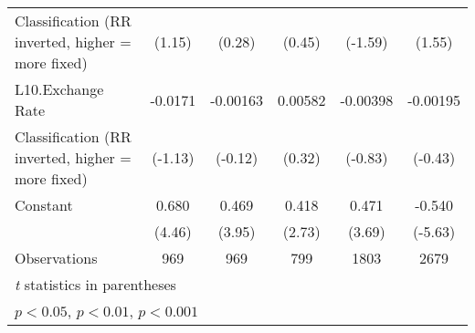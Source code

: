 {\begin{tabular}{l*{5}{c}}
Classification (RR inverted, higher = more fixed)&      (1.15)         &      (0.28)         &      (0.45)         &     (-1.59)         &      (1.55)         \\
[1em]
L10.Exchange Rate   &     -0.0171         &    -0.00163         &     0.00582         &    -0.00398         &    -0.00195         \\
Classification (RR inverted, higher = more fixed)&     (-1.13)         &     (-0.12)         &      (0.32)         &     (-0.83)         &     (-0.43)         \\
[1em]
Constant            &       0.680\sym{***}&       0.469\sym{***}&       0.418\sym{**} &       0.471\sym{***}&      -0.540\sym{***}\\
                    &      (4.46)         &      (3.95)         &      (2.73)         &      (3.69)         &     (-5.63)         \\
\hline
Observations        &         969         &         969         &         799         &        1803         &        2679         \\
\hline\hline
\multicolumn{6}{l}{\footnotesize \textit{t} statistics in parentheses}\\
\multicolumn{6}{l}{\footnotesize \sym{*} \(p<0.05\), \sym{**} \(p<0.01\), \sym{***} \(p<0.001\)}\\
\end{tabular}
}
